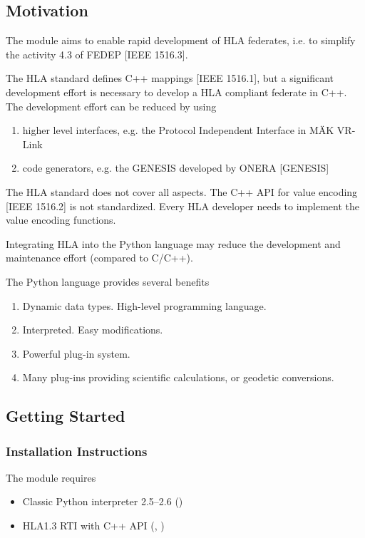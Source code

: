 \documentclass[12pt,a4paper]{howto}
\begin{document}
\subsection{Motivation}

The  module aims to enable rapid development of HLA federates,
i.e. to simplify the activity 4.3 of FEDEP [IEEE 1516.3].

The HLA standard defines C++ mappings [IEEE 1516.1], but a significant
development effort is necessary to develop a HLA compliant federate in C++.
The development effort can be reduced by using
\begin{enumerate}
\item higher level interfaces, e.g. the Protocol Independent Interface in M\"{A}K VR-Link
\item code generators, e.g. the GENESIS developed by ONERA [GENESIS]
\end{enumerate}

The HLA standard does not cover all aspects.
The C++ API for value encoding [IEEE 1516.2] is not standardized. Every HLA
developer needs to implement the value encoding functions.

Integrating HLA into the Python language may reduce the development and
maintenance effort (compared to C/C++).

The Python language provides several benefits
\begin{enumerate}
\item Dynamic data types. High-level programming language.
\item Interpreted. Easy modifications.
\item Powerful plug-in system.
\item Many plug-ins providing scientific calculations, or geodetic conversions.
\end{enumerate}

\subsection{Getting Started}

\subsubsection{Installation Instructions}

The  module requires
\begin{itemize}
\item Classic Python interpreter 2.5--2.6 ()
\item HLA1.3 RTI with C++ API (, )
\end{itemize}
\end{document}
